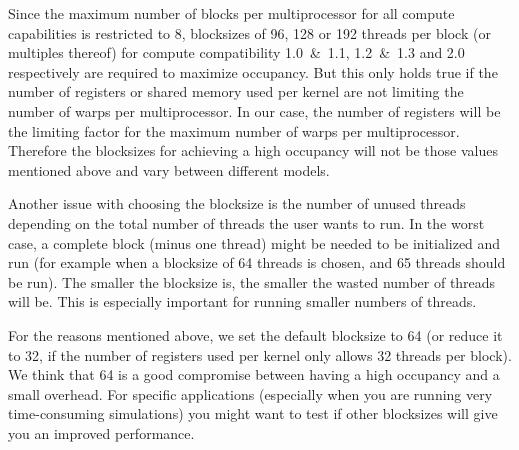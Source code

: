 \documentclass [11pt, a4paper, openany, twoside=off] {article}
\begin{document}
Since the maximum number of blocks per multiprocessor for all compute capabilities is restricted to 8, blocksizes of 96, 128 or 192 threads per block (or multiples thereof) for compute compatibility 1.0~\&~1.1, 1.2~\&~1.3 and 2.0 respectively are required to maximize occupancy. But this only holds true if the number of registers or shared memory used per kernel are not limiting the number of warps per multiprocessor. In our case, the number of registers will be the limiting factor for the maximum number of warps per multiprocessor. Therefore the blocksizes for achieving a high occupancy will not be those values mentioned above and vary between different models.

Another issue with choosing the blocksize is the number of unused threads depending on the total number of threads the user wants to run. In the worst case, a complete block (minus one thread) might be needed to be initialized and run (for example when a blocksize of 64 threads is chosen, and 65 threads should be run). The smaller the blocksize is, the smaller the wasted number of threads will be. This is especially important for running smaller numbers of threads.

For the reasons mentioned above, we set the default blocksize to 64 (or reduce it to 32, if the number of registers used per kernel only allows 32 threads per block). We think that 64 is a good compromise between having a high occupancy and a small overhead. For specific applications (especially when you are running very time-consuming simulations) you might want to test if other blocksizes will give you an improved performance.



\end{document}
